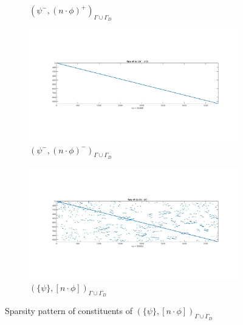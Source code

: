 \documentclass[a4paper,twoside,openright]{book}
\begin{document}
\begin{figure}
\begin{subfigure}{0.5\textwidth}
  \caption{$( \psi^- ,(n \cdot \phi)^+)_{\Gamma \cup \Gamma_D}$}
  \label{fig:figure43}
  \end{subfigure}
    \begin{subfigure}{0.5\textwidth}
    \includegraphics[width=\linewidth]{figure44.jpg}
  \caption{$( \psi^- ,(n \cdot \phi)^-)_{\Gamma \cup \Gamma_D}$}
  \label{fig:figure44}
  \end{subfigure}
  \begin{subfigure}{\textwidth}	
\centering
  \includegraphics[width=\linewidth]{figure4.jpg}
  \caption{$(\lbrace \psi \rbrace ,[n \cdot \phi])_{\Gamma \cup \Gamma_D}$}
  \label{fig:figure4}
\end{subfigure}
\caption{Sparsity pattern of constituents of $(\lbrace \psi  \rbrace,[n \cdot \phi])_{\Gamma \cup \Gamma_D}$}
\label{figure_4_all}
\end{figure}
\end{document}
